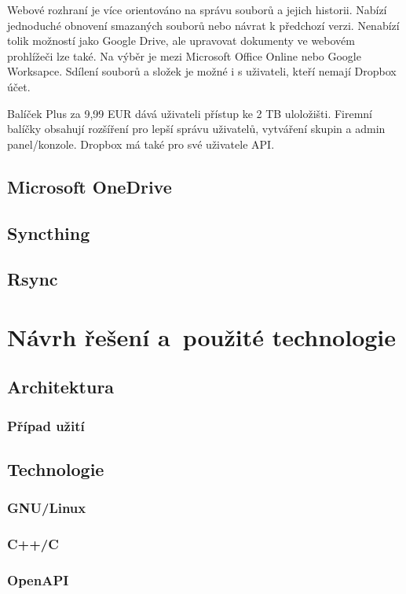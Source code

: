 Webové rozhraní je více orientováno na správu souborů a jejich historii. Nabízí jednoduché obnovení smazaných souborů nebo návrat k předchozí verzi.
Nenabízí tolik možností jako Google Drive, ale upravovat dokumenty ve webovém prohlížeči lze také. Na výběr je mezi Microsoft Office Online nebo Google Worksapce.
Sdílení souborů a složek je možné i s uživateli, kteří nemají Dropbox účet.

Balíček Plus za 9,99 EUR dává uživateli přístup ke 2 TB uloložišti. Firemní balíčky obsahují rozšíření pro lepší správu uživatelů, vytváření skupin a admin panel/konzole.
Dropbox má také pro své uživatele API.\cite{Dropbox}

\section{Microsoft OneDrive}

\cite{Microsoft365}

\section{Syncthing}
\section{Rsync}

\chapter{Návrh řešení a použité technologie}

\section{Architektura}
\subsection{Případ užití}

\section{Technologie}
\subsection{GNU/Linux}
\subsection{C++/C}
\subsection{OpenAPI}
